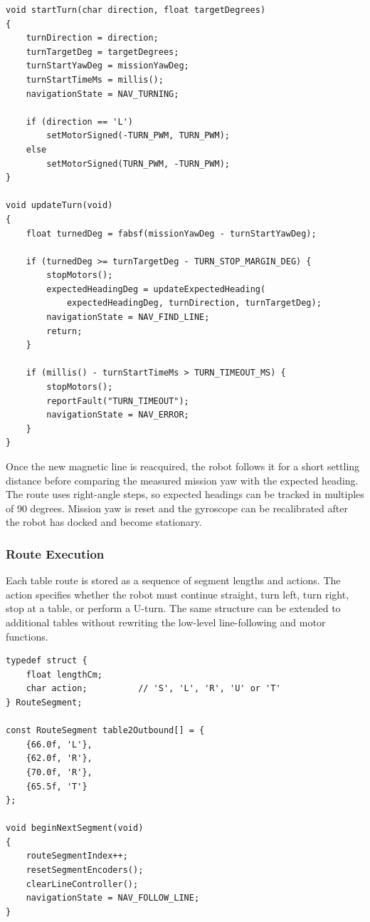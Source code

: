 \documentclass[12pt,a4paper]{article}
\begin{document}
\begin{lstlisting}[caption={Relative IMU turn control with a continuous mission heading.},label={lst:imu-turn}]
void startTurn(char direction, float targetDegrees)
{
    turnDirection = direction;
    turnTargetDeg = targetDegrees;
    turnStartYawDeg = missionYawDeg;
    turnStartTimeMs = millis();
    navigationState = NAV_TURNING;

    if (direction == 'L')
        setMotorSigned(-TURN_PWM, TURN_PWM);
    else
        setMotorSigned(TURN_PWM, -TURN_PWM);
}

void updateTurn(void)
{
    float turnedDeg = fabsf(missionYawDeg - turnStartYawDeg);

    if (turnedDeg >= turnTargetDeg - TURN_STOP_MARGIN_DEG) {
        stopMotors();
        expectedHeadingDeg = updateExpectedHeading(
            expectedHeadingDeg, turnDirection, turnTargetDeg);
        navigationState = NAV_FIND_LINE;
        return;
    }

    if (millis() - turnStartTimeMs > TURN_TIMEOUT_MS) {
        stopMotors();
        reportFault("TURN_TIMEOUT");
        navigationState = NAV_ERROR;
    }
}
\end{lstlisting}

Once the new magnetic line is reacquired, the robot follows it for a short
settling distance before comparing the measured mission yaw with the expected
heading. The route uses right-angle steps, so expected headings can be tracked
in multiples of 90 degrees. Mission yaw is reset and the gyroscope can be
recalibrated after the robot has docked and become stationary.

\subsubsection{Route Execution}

Each table route is stored as a sequence of segment lengths and actions. The
action specifies whether the robot must continue straight, turn left, turn
right, stop at a table, or perform a U-turn. The same structure can be extended
to additional tables without rewriting the low-level line-following and motor
functions.

\begin{lstlisting}[caption={Example route description and segment transition.},label={lst:route-table}]
typedef struct {
    float lengthCm;
    char action;          // 'S', 'L', 'R', 'U' or 'T'
} RouteSegment;

const RouteSegment table2Outbound[] = {
    {66.0f, 'L'},
    {62.0f, 'R'},
    {70.0f, 'R'},
    {65.5f, 'T'}
};

void beginNextSegment(void)
{
    routeSegmentIndex++;
    resetSegmentEncoders();
    clearLineController();
    navigationState = NAV_FOLLOW_LINE;
}
\end{lstlisting}
\end{document}
